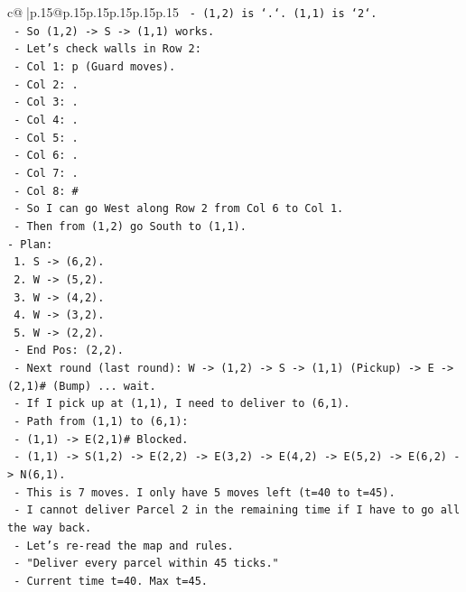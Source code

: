 \documentclass{article}
\begin{document}
{\begin{supertabular}{c@{$\;$}|p{.15\linewidth}@{}p{.15\linewidth}p{.15\linewidth}p{.15\linewidth}p{.15\linewidth}p{.15\linewidth}}
{{{\texttt{    {-} (1,2) is `.`. (1,1) is `2`.} \\
\texttt{    {-} So (1,2) {-}> S {-}> (1,1) works.} \\
\texttt{  {-} Let's check walls in Row 2:} \\
\texttt{    {-} Col 1: p (Guard moves).} \\
\texttt{    {-} Col 2: .} \\
\texttt{    {-} Col 3: .} \\
\texttt{    {-} Col 4: .} \\
\texttt{    {-} Col 5: .} \\
\texttt{    {-} Col 6: .} \\
\texttt{    {-} Col 7: .} \\
\texttt{    {-} Col 8: \#} \\
\texttt{  {-} So I can go West along Row 2 from Col 6 to Col 1.} \\
\texttt{  {-} Then from (1,2) go South to (1,1).} \\
\texttt{{-} Plan:} \\
\texttt{  1. S {-}> (6,2).} \\
\texttt{  2. W {-}> (5,2).} \\
\texttt{  3. W {-}> (4,2).} \\
\texttt{  4. W {-}> (3,2).} \\
\texttt{  5. W {-}> (2,2).} \\
\texttt{  {-} End Pos: (2,2).} \\
\texttt{  {-} Next round (last round): W {-}> (1,2) {-}> S {-}> (1,1) (Pickup) {-}> E {-}> (2,1)\# (Bump) ... wait.} \\
\texttt{  {-} If I pick up at (1,1), I need to deliver to (6,1).} \\
\texttt{  {-} Path from (1,1) to (6,1):} \\
\texttt{    {-} (1,1) {-}> E(2,1)\# Blocked.} \\
\texttt{    {-} (1,1) {-}> S(1,2) {-}> E(2,2) {-}> E(3,2) {-}> E(4,2) {-}> E(5,2) {-}> E(6,2) {-}> N(6,1).} \\
\texttt{    {-} This is 7 moves. I only have 5 moves left (t=40 to t=45).} \\
\texttt{    {-} I cannot deliver Parcel 2 in the remaining time if I have to go all the way back.} \\
\texttt{    {-} Let's re{-}read the map and rules.} \\
\texttt{    {-} "Deliver every parcel within 45 ticks."} \\
\texttt{    {-} Current time t=40. Max t=45.} \\
}}}
\end{supertabular}}
\end{document}
